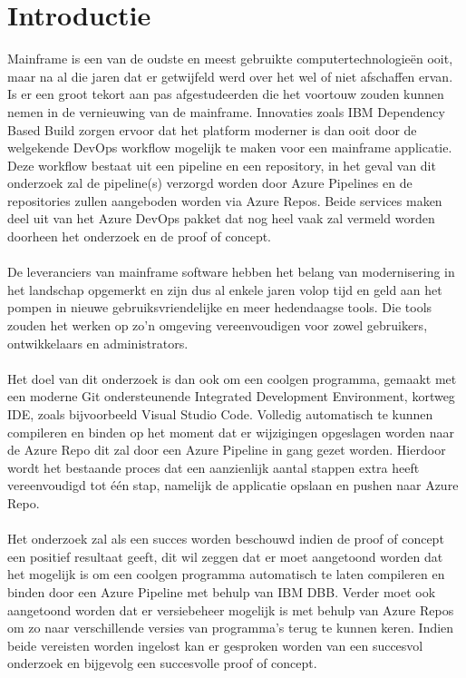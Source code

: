 
\section{Introductie}%
\label{sec:introductie}

Mainframe is een van de oudste en meest gebruikte computertechnologieën ooit, maar na al die jaren dat er getwijfeld werd over het wel of niet afschaffen ervan. 
Is er een groot tekort aan pas afgestudeerden die het voortouw zouden kunnen nemen in de vernieuwing van de mainframe. 
Innovaties zoals IBM Dependency Based Build zorgen ervoor dat het platform moderner is dan ooit door de welgekende DevOps workflow mogelijk te maken voor een mainframe applicatie. 
Deze workflow bestaat uit een pipeline en een repository, in het geval van dit onderzoek zal de pipeline(s) verzorgd worden door Azure Pipelines en de repositories zullen aangeboden worden via Azure Repos. 
Beide services maken deel uit van het Azure DevOps pakket dat nog heel vaak zal vermeld worden doorheen het onderzoek en de proof of concept.
\\ \\
De leveranciers van mainframe software hebben het belang van modernisering in het landschap opgemerkt en zijn dus al enkele jaren volop tijd en geld aan het pompen in nieuwe gebruiksvriendelijke en meer hedendaagse tools.
Die tools zouden het werken op zo'n omgeving vereenvoudigen voor zowel gebruikers, ontwikkelaars en administrators. 
\\ \\
Het doel van dit onderzoek is dan ook om een coolgen programma, gemaakt met een moderne Git ondersteunende Integrated Development Environment, kortweg IDE, zoals bijvoorbeeld Visual Studio Code.
Volledig automatisch te kunnen compileren en binden op het moment dat er wijzigingen opgeslagen worden naar de Azure Repo dit zal door een Azure Pipeline in gang gezet worden.
Hierdoor wordt het bestaande proces dat een aanzienlijk aantal stappen extra heeft vereenvoudigd tot één stap, namelijk de applicatie opslaan en pushen naar Azure Repo. 
\\ \\
Het onderzoek zal als een succes worden beschouwd indien de proof of concept een positief resultaat geeft, dit wil zeggen dat er moet aangetoond worden dat het mogelijk is om een coolgen programma 
automatisch te laten compileren en binden door een Azure Pipeline met behulp van IBM DBB. 
Verder moet ook aangetoond worden dat er versiebeheer mogelijk is met behulp van Azure Repos om zo naar verschillende versies van programma's terug te kunnen keren. 
Indien beide vereisten worden ingelost kan er gesproken worden van een succesvol onderzoek en bijgevolg een succesvolle proof of concept. 


